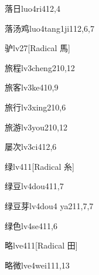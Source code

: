 \begin{entry}{落日}{luo4ri4}{12,4}
\end{entry}

\begin{entry}{落汤鸡}{luo4tang1ji1}{12,6,7}
\end{entry}

\begin{entry}{驴}{lv2}{7}[Radical 馬]
\end{entry}

\begin{entry}{旅程}{lv3cheng2}{10,12}
\end{entry}

\begin{entry}{旅客}{lv3ke4}{10,9}
\end{entry}

\begin{entry}{旅行}{lv3xing2}{10,6}
\end{entry}

\begin{entry}{旅游}{lv3you2}{10,12}
\end{entry}

\begin{entry}{屡次}{lv3ci4}{12,6}
\end{entry}

\begin{entry}{绿}{lv4}{11}[Radical 糸]
\end{entry}

\begin{entry}{绿豆}{lv4dou4}{11,7}
\end{entry}

\begin{entry}{绿豆芽}{lv4dou4 ya2}{11,7,7}
\end{entry}

\begin{entry}{绿色}{lv4se4}{11,6}
\end{entry}

\begin{entry}{略}{lve4}{11}[Radical 田]
\end{entry}

\begin{entry}{略微}{lve4wei1}{11,13}
\end{entry}


